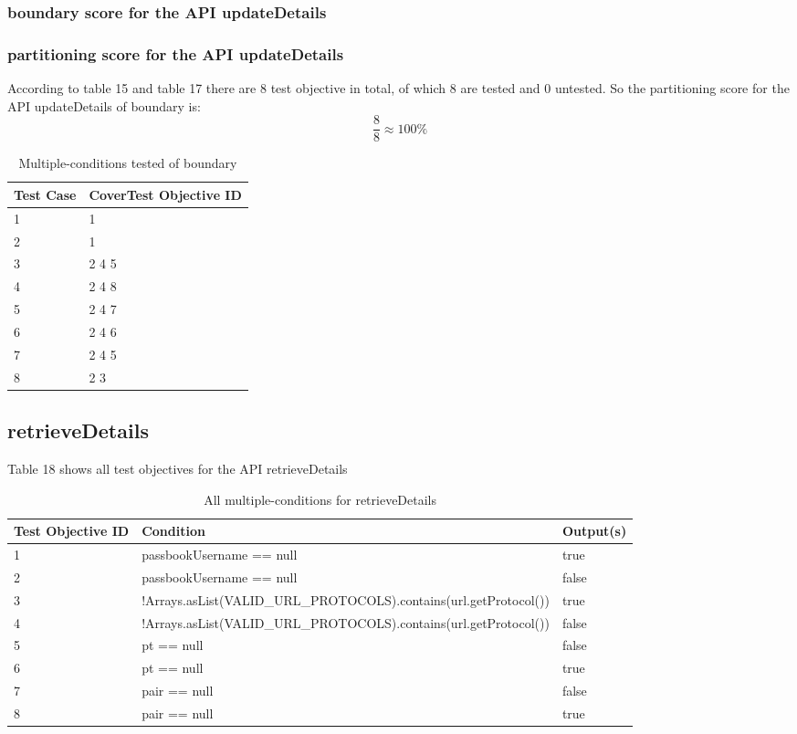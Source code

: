 \documentclass{article}
\begin{document}
\subsubsection{boundary score for the API updateDetails}
\subsubsection{partitioning score for the API updateDetails}
According to table 15 and table 17 there are 8 test objective in total, of which 8 are tested and 0 untested. So the partitioning score for the API updateDetails of boundary is:
$$\frac{8}{8}\approx100\%$$
\begin{longtable}{|p{2cm}|p{8cm}|}
\caption{Multiple-conditions tested of boundary}\\
\hline 
Test Case& CoverTest Objective ID\\
\hline  
1&1\\
\hline
2&1\\
\hline
3&2 4 5\\
\hline
4&2 4 8\\
\hline
5&2 4 7\\
\hline
6&2 4 6\\
\hline
7&2 4 5\\
\hline
8&2 3\\
\hline
\end{longtable}
\subsection{retrieveDetails}
Table 18 shows all test objectives for the API retrieveDetails
\begin{longtable}{|p{2cm}|p{11cm}|p{2cm}|}
\caption{All multiple-conditions for retrieveDetails}\\
\hline 
Test Objective ID&Condition&Output(s)\\
\hline  
1&passbookUsername == null&true\\
\hline
2&passbookUsername == null&false\\
\hline
3&!Arrays.asList(VALID\_URL\_PROTOCOLS).contains(url.getProtocol())&true\\
\hline
4&!Arrays.asList(VALID\_URL\_PROTOCOLS).contains(url.getProtocol())&false\\
\hline
5&pt == null&false\\
\hline
6&pt == null&true\\
\hline
7&pair == null&false\\
\hline
8&pair == null&true\\
\hline
\end{longtable}
\end{document}
